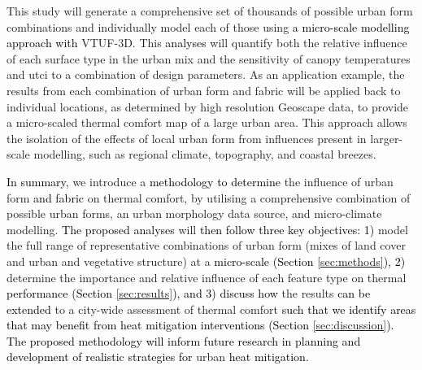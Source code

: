 \documentclass[final,3p,times,authoryear]{elsarticle}
\newcommand{\add}[1]{\textcolor{black}{#1}}
\newcommand{\remove}[1]{\textcolor{red}{\st{}}}
\begin{document}
This study will generate a comprehensive set of thousands of possible urban form combinations and individually model each of those using \add{a micro-scale modelling approach with} VTUF-3D. This \add{analyses} will quantify both the relative influence of each surface type in the urban mix and the sensitivity of canopy temperatures and \gls{utci} to a combination of design parameters. As an application example, the results from each combination of urban form and fabric will be applied back to individual locations, as determined by high resolution Geoscape data, to provide a micro-scaled thermal comfort map of a large urban area. This approach allows the isolation of the effects of local urban form from influences present in larger-scale modelling, such as regional climate, topography, and coastal breezes.

\remove{Therefore, in this study}\add{In summary,} we introduce a \remove{method that determines}\add{methodology to determine} the influence of \remove{just}urban form \add{and fabric} on thermal comfort, by utilising a comprehensive combination of possible urban forms, an urban morphology data source, and micro-climate modelling. \remove{This is then applied at a city-wide scale to identify areas that may benefit from heat mitigation interventions, and to inform planning and development of new climate sensitive urban form. The first objective}\add{The proposed analyses} will \remove{be to}\add{then follow three key objectives: 1)} model the full range of representative combinations of urban form (mixes of land cover and urban and vegetative structure) at a \remove{micro-scale. The second objective will be to use these results to}\add{micro-scale (Section \ref{sec:methods}), 2)} determine the importance and relative influence of each feature type on thermal \remove{performance. The final objective will be to build}\add{performance (Section \ref{sec:results}), and 3) discuss how} the results \remove{back up}\add{can be extended} to a city-wide assessment of thermal comfort \remove{generated by}\add{such that we identify areas that may benefit from heat mitigation interventions (Section \ref{sec:discussion}). The proposed methodology will inform future research in planning and development of realistic strategies for} urban \remove{form.}\add{heat mitigation.} 
\end{document}

